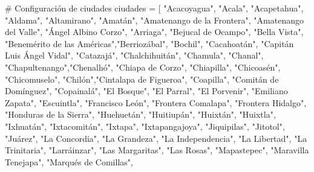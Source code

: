 \documentclass[
  letterpaper,
  DIV=11,
  numbers=noendperiod]{scrreprt}
\newenvironment{Shaded}{\begin{snugshade}}{\end{snugshade}}
\newcommand{\CommentTok}[1]{\textcolor[rgb]{0.37,0.37,0.37}{#1}}
\newcommand{\NormalTok}[1]{\textcolor[rgb]{0.00,0.23,0.31}{#1}}
\newcommand{\OperatorTok}[1]{\textcolor[rgb]{0.37,0.37,0.37}{#1}}
\newcommand{\StringTok}[1]{\textcolor[rgb]{0.13,0.47,0.30}{#1}}
\begin{document}
\begin{Shaded}
\begin{Highlighting}[]
\CommentTok{\# Configuración de ciudades}
\NormalTok{ciudades }\OperatorTok{=}\NormalTok{ [}
    \StringTok{"Acacoyagua"}\NormalTok{, }\StringTok{"Acala"}\NormalTok{, }\StringTok{"Acapetahua"}\NormalTok{, }\StringTok{"Aldama"}\NormalTok{, }\StringTok{"Altamirano"}\NormalTok{, }\StringTok{"Amatán"}\NormalTok{, }
    \StringTok{"Amatenango de la Frontera"}\NormalTok{, }\StringTok{"Amatenango del Valle"}\NormalTok{, }\StringTok{"Ángel Albino Corzo"}\NormalTok{,}
    \StringTok{"Arriaga"}\NormalTok{, }\StringTok{"Bejucal de Ocampo"}\NormalTok{, }\StringTok{"Bella Vista"}\NormalTok{, }
    \StringTok{"Benemérito de las Américas"}\NormalTok{,}\StringTok{"Berriozábal"}\NormalTok{, }\StringTok{"Bochil"}\NormalTok{, }\StringTok{"Cacahoatán"}\NormalTok{, }
    \StringTok{"Capitán Luis Ángel Vidal"}\NormalTok{, }\StringTok{"Catazajá"}\NormalTok{, }\StringTok{"Chalchihuitán"}\NormalTok{, }\StringTok{"Chamula"}\NormalTok{, }
    \StringTok{"Chanal"}\NormalTok{, }\StringTok{"Chapultenango"}\NormalTok{,}\StringTok{"Chenalhó"}\NormalTok{, }\StringTok{"Chiapa de Corzo"}\NormalTok{, }\StringTok{"Chiapilla"}\NormalTok{, }
    \StringTok{"Chicoasén"}\NormalTok{, }\StringTok{"Chicomuselo"}\NormalTok{, }\StringTok{"Chilón"}\NormalTok{,}\StringTok{"Cintalapa de Figueroa"}\NormalTok{, }\StringTok{"Coapilla"}\NormalTok{, }
    \StringTok{"Comitán de Domínguez"}\NormalTok{, }\StringTok{"Copainalá"}\NormalTok{, }\StringTok{"El Bosque"}\NormalTok{, }\StringTok{"El Parral"}\NormalTok{,}
    \StringTok{"El Porvenir"}\NormalTok{, }\StringTok{"Emiliano Zapata"}\NormalTok{, }\StringTok{"Escuintla"}\NormalTok{, }\StringTok{"Francisco León"}\NormalTok{, }
    \StringTok{"Frontera Comalapa"}\NormalTok{, }\StringTok{"Frontera Hidalgo"}\NormalTok{, }\StringTok{"Honduras de la Sierra"}\NormalTok{,}
    \StringTok{"Huehuetán"}\NormalTok{, }\StringTok{"Huitiupán"}\NormalTok{, }\StringTok{"Huixtán"}\NormalTok{, }\StringTok{"Huixtla"}\NormalTok{, }\StringTok{"Ixhuatán"}\NormalTok{,}
    \StringTok{"Ixtacomitán"}\NormalTok{, }\StringTok{"Ixtapa"}\NormalTok{, }\StringTok{"Ixtapangajoya"}\NormalTok{, }\StringTok{"Jiquipilas"}\NormalTok{, }\StringTok{"Jitotol"}\NormalTok{, }
    \StringTok{"Juárez"}\NormalTok{, }\StringTok{"La Concordia"}\NormalTok{, }\StringTok{"La Grandeza"}\NormalTok{, }\StringTok{"La Independencia"}\NormalTok{, }
    \StringTok{"La Libertad"}\NormalTok{, }\StringTok{"La Trinitaria"}\NormalTok{, }\StringTok{"Larráinzar"}\NormalTok{, }\StringTok{"Las Margaritas"}\NormalTok{, }
    \StringTok{"Las Rosas"}\NormalTok{, }\StringTok{"Mapastepec"}\NormalTok{, }\StringTok{"Maravilla Tenejapa"}\NormalTok{, }\StringTok{"Marqués de Comillas"}\NormalTok{,}

\end{Highlighting}
\end{Shaded}
\end{document}
